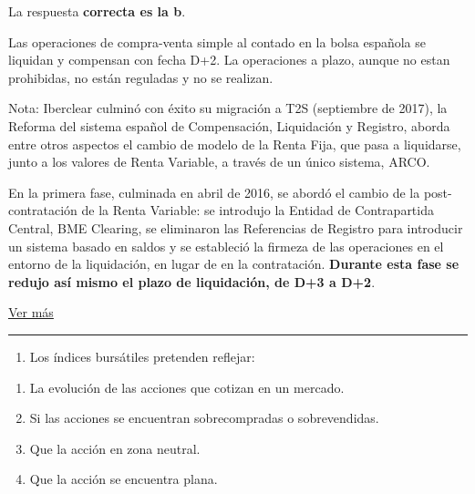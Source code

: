 \documentclass[
  letterpaper,
  DIV=11,
  numbers=noendperiod]{scrreprt}
\providecommand{\tightlist}{%
  \setlength{\itemsep}{0pt}\setlength{\parskip}{0pt}}\usepackage{longtable,booktabs,array}
\begin{document}
\begin{tcolorbox}[enhanced jigsaw, left=2mm, opacityback=0, colback=white, breakable, arc=.35mm, bottomrule=.15mm, rightrule=.15mm, toprule=.15mm, leftrule=.75mm, colframe=quarto-callout-tip-color-frame]
\begin{minipage}[t]{5.5mm}
\textcolor{quarto-callout-tip-color}{\faLightbulb}
\end{minipage}%
\begin{minipage}[t]{\textwidth - 5.5mm}

La respuesta \textbf{correcta es la b}.

Las operaciones de compra-venta simple al contado en la bolsa española
se liquidan y compensan con fecha D+2. La operaciones a plazo, aunque no
estan prohibidas, no están reguladas y no se realizan.

Nota: Iberclear culminó con éxito su migración a T2S (septiembre de
2017), la Reforma del sistema español de Compensación, Liquidación y
Registro, aborda entre otros aspectos el cambio de modelo de la Renta
Fija, que pasa a liquidarse, junto a los valores de Renta Variable, a
través de un único sistema, ARCO.

En la primera fase, culminada en abril de 2016, se abordó el cambio de
la post-contratación de la Renta Variable: se introdujo la Entidad de
Contrapartida Central, BME Clearing, se eliminaron las Referencias de
Registro para introducir un sistema basado en saldos y se estableció la
firmeza de las operaciones en el entorno de la liquidación, en lugar de
en la contratación. \textbf{Durante esta fase se redujo así mismo el
plazo de liquidación, de D+3 a D+2}.

\href{https://www.bolsasymercados.es/esp/Sala-Comunicacion/Nota-Prensa/20170918/nota_20170918_1/Iberclear_culmina_con_\%C3\%A9xito_su_migraci\%C3\%B3n_a_T2S}{Ver
más}

\end{minipage}%
\end{tcolorbox}

\begin{center}\rule{0.5\linewidth}{0.5pt}\end{center}

\begin{enumerate}
\def\labelenumi{\arabic{enumi}.}
\setcounter{enumi}{49}
\tightlist
\item
  Los índices bursátiles pretenden reflejar:
\end{enumerate}

\begin{enumerate}
\def\labelenumi{\alph{enumi})}
\item
  La evolución de las acciones que cotizan en un mercado.
\item
  Si las acciones se encuentran sobrecompradas o sobrevendidas.
\item
  Que la acción en zona neutral.
\item
  Que la acción se encuentra plana.
\end{enumerate}
\end{document}
